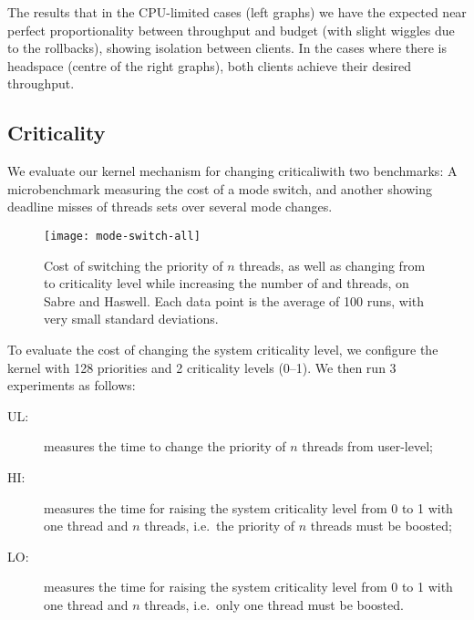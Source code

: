 The results that in the CPU-limited cases (left graphs)
we have the expected near perfect proportionality between throughput and
budget (with slight wiggles due to the rollbacks), showing isolation between clients. In the cases where there is headspace (centre of the right
graphs), both clients achieve their desired throughput.

\subsection{Criticality}

We evaluate our kernel mechanism for changing criticaliwith two benchmarks: A
microbenchmark measuring the cost of a mode switch, and another showing deadline misses of threads sets over several mode changes.

\begin{figure}[t]
  \centering
  \texttt{[image: mode-switch-all]}
  \caption{Cost of switching the priority of $n$ threads, as well as changing from  to
   criticality level while increasing the number of  and  threads,
  on Sabre and Haswell. Each data point is the average of 100 runs, with very small standard
  deviations.}
  \label{f:mode-switch}
\end{figure}

To evaluate the cost of changing the system criticality level, we
configure the kernel with 128 priorities and 2 criticality levels
(0--1). We then  run 3 experiments as follows:
\iffalse                        %
\begin{itemize}
\item \textbf{UL:} measures the time to change the priority of $n$ threads from user-level;
\item \textbf{HI:} measures the time for raising the system criticality level from 0 to 1 with one \crit{low} thread and $n$
    \crit{high} threads, i.e.\ threads whose priority must be boosted upon criticality switch,
\item \textbf{LO:} measures the time for raising the system criticality level from 0 to 1 with one \crit{high} thread and
 } threads, whose priority does not need to be boosted.
\end{itemize}
\else                           %
\begin{description}
\item[UL:] measures the time to change the priority of $n$ threads from user-level;
\item[HI:] measures the time for raising the system criticality level from 0 to 1 with one  thread and $n$
     threads, i.e.\ the priority of $n$ threads must be boosted;
\item[LO:] measures the time for raising the system criticality level from 0 to 1 with one  thread and
    $n$  threads, i.e.\ only one thread must be boosted.
\end{description}
\fi

